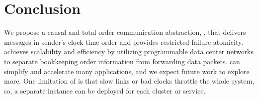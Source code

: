 \section{Conclusion}
\label{sec:conclusion}

We propose a causal and total order communication abstraction, \sys{}, that delivers messages in sender's clock time order and provides restricted failure atomicity. 
\sys{} achieves scalability and efficiency by utilizing programmable data center networks to separate bookkeeping order information from forwarding data packets.
\sys{} can simplify and accelerate many applications, and we expect future work to explore more. %
One limitation of \sys{} is that  slow links or bad clocks throttle the whole system, so, a separate \sys{} instance can be deployed for each cluster or service.
